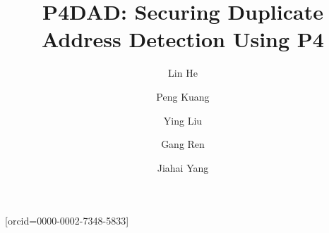 \documentclass[a4paper,fleqn]{cas-dc}
\begin{document}
\let\WriteBookmarks\relax
\def\floatpagepagefraction{1}
\def\textpagefraction{.001}

\title [mode = title]{P4DAD: Securing Duplicate Address Detection Using P4}                      




\author{Lin He}[orcid=0000-0002-7348-5833]
\author{Peng Kuang}
\author{Ying Liu}
\author{Gang Ren}
\author{Jiahai Yang}
\address{Institute for Network Sciences and Cyberspace, Tsinghua University, Beijing 100084, China\\
Beijing National Research Center for Information Science and Technology (BNRist)
}










\end{document}
